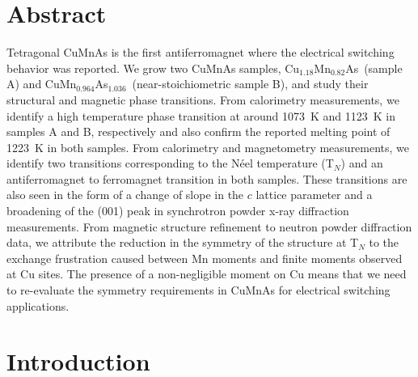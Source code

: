 \documentclass[10pt,doublespacing,edeposit]{uiucthesis2020}
\newcommand*{\cuexcess}{Cu$_{1.18}$Mn$_{0.82}$As}
\newcommand*{\asexcess}{CuMn$_{0.964}$As$_{1.036}$}
\begin{document}
\begin{mainmatter}
\section{Abstract}
Tetragonal CuMnAs is the first antiferromagnet where the electrical switching behavior was reported. 
We grow two CuMnAs samples, \cuexcess\ (sample A) and \asexcess\ (near-stoichiometric sample B), and study their structural and magnetic phase transitions. From calorimetry measurements, we identify a high temperature phase transition at around 1073~K and 1123~K in samples A and B, respectively and also confirm the reported melting point of 1223~K in both samples. From calorimetry and magnetometry measurements, we identify two transitions corresponding to the N\'eel temperature (T$_N$) and an antiferromagnet to ferromagnet transition in both samples. These transitions are also seen in the form of a change of slope in the $c$ lattice parameter and a broadening of the (001) peak in synchrotron powder x-ray diffraction measurements. From magnetic structure refinement to neutron powder diffraction data, we attribute the reduction in the symmetry of the structure at T$_N$ to the exchange frustration caused between Mn moments and finite moments observed at Cu sites. The presence of a non-negligible moment on Cu means that we need to re-evaluate the symmetry requirements in CuMnAs for electrical switching applications.


\section{Introduction} 



\end{mainmatter}
\end{document}
